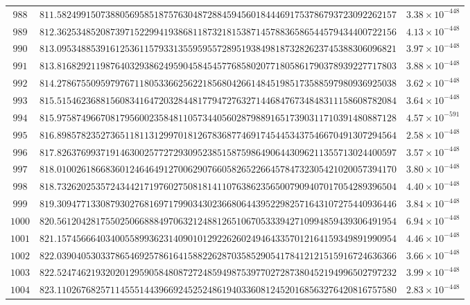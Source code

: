 \documentclass[12pt,reqno]{amsart}
\theoremstyle{remark}
\begin{document}
\begin{longtable}{clc}
$988$ & $811.5824991507388056958518757630487288459456018444691753786793723092262157$ & $3.38\times 10^{-448}$ \\
$989$ & $812.3625348520873971522994193868118732181538714578836586544579434400722156$ & $4.13\times 10^{-448}$ \\
$990$ & $813.0953488539161253611579331355959557289519384981873282623745388306096821$ & $3.97\times 10^{-448}$ \\
$991$ & $813.8168292119876403293862495904584545776858020771805861790378939227717803$ & $3.88\times 10^{-448}$ \\
$992$ & $814.2786755095979767118053366256221856804266148451985173588597980936925038$ & $3.62\times 10^{-448}$ \\
$993$ & $815.5154623688156083416472032844817794727632714468476734848311158608782084$ & $3.64\times 10^{-448}$ \\
$994$ & $815.9758749667081795600235848110573440560287988916517390311710391480887128$ & $4.57\times 10^{-591}$ \\
$995$ & $816.8985782352736511811312997018126783687746917454453437546670491307294564$ & $2.58\times 10^{-448}$ \\
$996$ & $817.8263769937191463002577272930952385158759864906443096211355713024400597$ & $3.57\times 10^{-448}$ \\
$997$ & $818.0100261866836012464649127006290766058265226645784732305421020057394170$ & $3.80\times 10^{-448}$ \\
$998$ & $818.7326202535724344217197602750818141107638623565007909407017054289396504$ & $4.40\times 10^{-448}$ \\
$999$ & $819.3094771330879302768169717990343023668064439522982571643107275440936446$ & $3.84\times 10^{-448}$ \\
$1000$ & $820.5612042817550250668884970632124881265106705333942710994859439306491954$ & $6.94\times 10^{-448}$ \\
$1001$ & $821.1574566640340055899362314090101292262602494643357012164159349891990954$ & $4.46\times 10^{-448}$ \\
$1002$ & $822.0390405303378654692578616415882262870358529054178412121515916724636366$ & $3.66\times 10^{-448}$ \\
$1003$ & $822.5247462193202012959058480872724859498753977027287380452194996502797232$ & $3.99\times 10^{-448}$ \\
$1004$ & $823.1102676825711455514439669245252486194033608124520168563276420816757580$ & $2.83\times 10^{-448}$ \\

\end{longtable}
\end{document}
